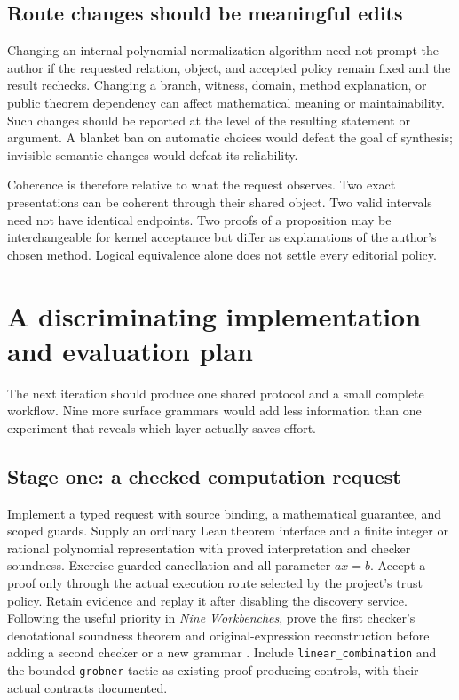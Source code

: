 \documentclass[11pt,letterpaper]{article}
\begin{document}
\subsection{Route changes should be meaningful edits}
Changing an internal polynomial normalization algorithm need not prompt the
author if the requested relation, object, and accepted policy remain fixed and
the result rechecks. Changing a branch, witness, domain, method explanation, or
public theorem dependency can affect mathematical meaning or maintainability.
Such changes should be reported at the level of the resulting statement or
argument. A blanket ban on automatic choices would defeat the goal of synthesis;
invisible semantic changes would defeat its reliability.

Coherence is therefore relative to what the request observes. Two exact
presentations can be coherent through their shared object. Two valid intervals
need not have identical endpoints. Two proofs of a proposition may be
interchangeable for kernel acceptance but differ as explanations of the
author's chosen method. Logical equivalence alone does not settle every
editorial policy.

\section{A discriminating implementation and evaluation plan}\label{sec:evaluation}
The next iteration should produce one shared protocol and a small complete
workflow. Nine more surface grammars would add less information than one
experiment that reveals which layer actually saves effort.

\subsection{Stage one: a checked computation request}
Implement a typed request with source binding, a mathematical guarantee, and
scoped guards. Supply an ordinary Lean theorem interface and a finite integer
or rational polynomial representation with proved interpretation and checker
soundness. Exercise guarded cancellation and all-parameter \(ax=b\). Accept a
proof only through the actual execution route selected by the project's trust
policy. Retain evidence and replay it after disabling the discovery service.
Following the useful priority in \emph{Nine Workbenches}, prove the first
checker's denotational soundness theorem and original-expression reconstruction
before adding a second checker or a new grammar \cite[\S\S9.3--10]{secondary}.
Include \texttt{linear\_combination} and the bounded \texttt{grobner} tactic as
existing proof-producing controls, with their actual contracts documented.
\end{document}

